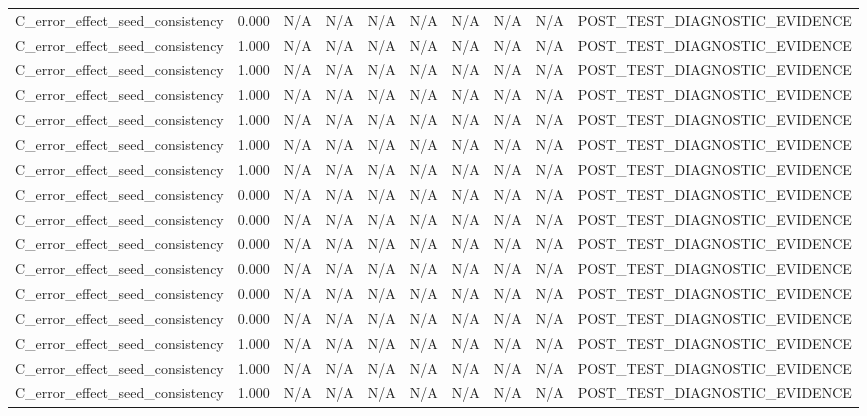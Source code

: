 \begin{table}[h!]
\begin{tabular}{lrrrrrrrrr}
C\_error\_effect\_seed\_consistency & 0.000 & N/A & N/A & N/A & N/A & N/A & N/A & N/A & POST\_TEST\_DIAGNOSTIC\_EVIDENCE \\
C\_error\_effect\_seed\_consistency & 1.000 & N/A & N/A & N/A & N/A & N/A & N/A & N/A & POST\_TEST\_DIAGNOSTIC\_EVIDENCE \\
C\_error\_effect\_seed\_consistency & 1.000 & N/A & N/A & N/A & N/A & N/A & N/A & N/A & POST\_TEST\_DIAGNOSTIC\_EVIDENCE \\
C\_error\_effect\_seed\_consistency & 1.000 & N/A & N/A & N/A & N/A & N/A & N/A & N/A & POST\_TEST\_DIAGNOSTIC\_EVIDENCE \\
C\_error\_effect\_seed\_consistency & 1.000 & N/A & N/A & N/A & N/A & N/A & N/A & N/A & POST\_TEST\_DIAGNOSTIC\_EVIDENCE \\
C\_error\_effect\_seed\_consistency & 1.000 & N/A & N/A & N/A & N/A & N/A & N/A & N/A & POST\_TEST\_DIAGNOSTIC\_EVIDENCE \\
C\_error\_effect\_seed\_consistency & 1.000 & N/A & N/A & N/A & N/A & N/A & N/A & N/A & POST\_TEST\_DIAGNOSTIC\_EVIDENCE \\
C\_error\_effect\_seed\_consistency & 0.000 & N/A & N/A & N/A & N/A & N/A & N/A & N/A & POST\_TEST\_DIAGNOSTIC\_EVIDENCE \\
C\_error\_effect\_seed\_consistency & 0.000 & N/A & N/A & N/A & N/A & N/A & N/A & N/A & POST\_TEST\_DIAGNOSTIC\_EVIDENCE \\
C\_error\_effect\_seed\_consistency & 0.000 & N/A & N/A & N/A & N/A & N/A & N/A & N/A & POST\_TEST\_DIAGNOSTIC\_EVIDENCE \\
C\_error\_effect\_seed\_consistency & 0.000 & N/A & N/A & N/A & N/A & N/A & N/A & N/A & POST\_TEST\_DIAGNOSTIC\_EVIDENCE \\
C\_error\_effect\_seed\_consistency & 0.000 & N/A & N/A & N/A & N/A & N/A & N/A & N/A & POST\_TEST\_DIAGNOSTIC\_EVIDENCE \\
C\_error\_effect\_seed\_consistency & 0.000 & N/A & N/A & N/A & N/A & N/A & N/A & N/A & POST\_TEST\_DIAGNOSTIC\_EVIDENCE \\
C\_error\_effect\_seed\_consistency & 1.000 & N/A & N/A & N/A & N/A & N/A & N/A & N/A & POST\_TEST\_DIAGNOSTIC\_EVIDENCE \\
C\_error\_effect\_seed\_consistency & 1.000 & N/A & N/A & N/A & N/A & N/A & N/A & N/A & POST\_TEST\_DIAGNOSTIC\_EVIDENCE \\
C\_error\_effect\_seed\_consistency & 1.000 & N/A & N/A & N/A & N/A & N/A & N/A & N/A & POST\_TEST\_DIAGNOSTIC\_EVIDENCE \\

\end{tabular}
\end{table}
